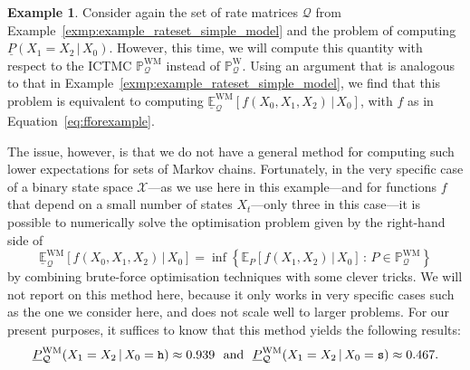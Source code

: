\documentclass[10pt,a4paper]{paper}
\theoremstyle{definition}
\newtheorem{exmp}{Example}%
\newcommand{\states}{\mathcal{X}}
\newcommand{\processes}{\mathbb{P}}
\newcommand{\wprocesses}{\processes^{\mathrm{W}}}
\newcommand{\wmprocesses}{\processes^{\mathrm{WM}}}
\newcommand{\gambles}{\mathcal{L}}
\newcommand{\gamblesX}{\gambles(\states)}
\newcommand{\rateset}{\mathcal{Q}}
\newcommand{\ictmc}{{ICTMC}}
\begin{document}
\begin{exmp} \label{exmp:num_counterexample_markov}
Consider again the set of rate matrices $\rateset$ from Example~\ref{exmp:example_rateset_simple_model} and the problem of computing $\underline{P}(X_1 = X_2\,\vert\, X_0)$. However, this time, we will compute this quantity with respect to the {\ictmc} $\wmprocesses_{\rateset}$ instead of $\wprocesses_{\rateset}$. Using an argument that is analogous to that in Example~\ref{exmp:example_rateset_simple_model}, we find that this problem is equivalent to computing $\underline{\mathbb{E}}_{\rateset}^{\mathrm{WM}}[f(X_0,X_1,X_2)\,\vert\,X_0]$, with $f$ as in Equation~\eqref{eq:fforexample}. %

The issue, however, is that we do not have a general method for computing such lower expectations for sets of Markov chains. Fortunately, in the very specific case of a binary state space $\mathcal{X}$---as we use here in this example---and for functions $f$ that depend on a small number of states $X_t$---only three in this case---it is possible to numerically solve the optimisation problem given by the right-hand side of
\begin{equation*}
\underline{\mathbb{E}}_{\rateset}^{\mathrm{WM}}[f(X_0,X_1,X_2)\,\vert\,X_0] = \inf\left\{ \mathbb{E}_P[f(X_1,X_2)\,\vert\,X_0]\,:\,P\in\wmprocesses_\rateset\right\}%
\end{equation*}
by combining brute-force optimisation techniques with some clever tricks. We will not report on this method here, because it only works in very specific cases such as the one we consider here, and does not scale well to larger problems. For our present purposes, it suffices to know that this method yields the following results:
\begin{align*}
\underline{P}_{\rateset}^{\mathrm{WM}}(X_1 = X_2\,\vert\,X_0=\text{{\tt h}}) \approx 0.939~~\text{and}~~\underline{P}_{\rateset}^{\mathrm{WM}}(X_1 = X_2\,\vert\,X_0=\text{{\tt s}}) \approx 0.467.
\end{align*}


\end{exmp}
\end{document}
